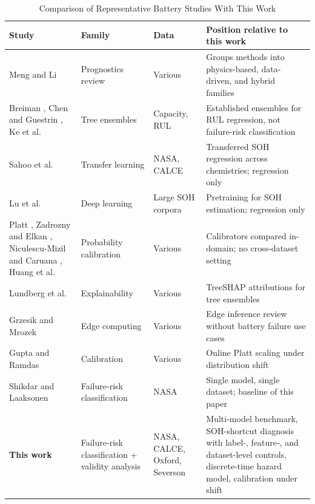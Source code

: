 \documentclass[IJPHM, 2014, 00]{PHMSociety}
\begin{document}
\begin{table}[!t]
\caption{Comparison of Representative Battery Studies With This Work}
\label{tab:lit}
\centering
\begin{tabular}{p{}p{}p{}p{}}
\toprule
\textbf{Study} & \textbf{Family} & \textbf{Data} & \textbf{Position relative to this work}\\
\midrule
Meng and Li \citeyear{meng2019review} & Prognostics review & Various & Groups methods into physics-based, data-driven, and hybrid families\\
Breiman \citeyear{breiman2001random}, Chen and Guestrin \citeyear{chen2016xgboost}, Ke et al. \citeyear{ke2017lightgbm} & Tree ensembles & Capacity, RUL & Established ensembles for RUL regression, not failure-risk classification\\
Sahoo et al. \citeyear{sahoo2022transfer} & Transfer learning & NASA, CALCE & Transferred SOH regression across chemistries; regression only\\
Lu et al. \citeyear{lu2023deep} & Deep learning & Large SOH corpora & Pretraining for SOH estimation; regression only\\
Platt \citeyear{platt1999probabilistic}, Zadrozny and Elkan \citeyear{zadrozny2002transforming}, Niculescu-Mizil and Caruana \citeyear{niculescu2005predicting}, Huang et al. \citeyear{huang2020experimental} & Probability calibration & Various & Calibrators compared in-domain; no cross-dataset setting\\
Lundberg et al. \citeyear{lundberg2020from} & Explainability & Various & TreeSHAP attributions for tree ensembles\\
Grzesik and Mrozek \citeyear{grzesik2024combining} & Edge computing & Various & Edge inference review without battery failure use cases\\
Gupta and Ramdas \citeyear{gupta2023online} & Calibration & Various & Online Platt scaling under distribution shift\\
Shikdar and Laaksonen \citeyear{shikdar2026learning} & Failure-risk classification & NASA & Single model, single dataset; baseline of this paper\\
\textbf{This work} & Failure-risk classification + validity analysis & NASA, CALCE, Oxford, Severson & Multi-model benchmark, SOH-shortcut diagnosis with label-, feature-, and dataset-level controls, discrete-time hazard model, calibration under shift\\
\bottomrule
\end{tabular}
\end{table}
\end{document}
